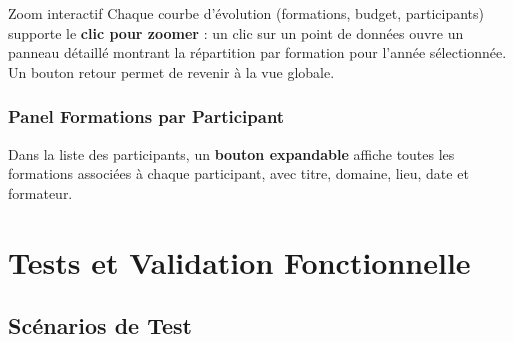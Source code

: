 \documentclass[12pt,a4paper]{report}
\begin{document}
\begin{notebox}{Zoom interactif}
Chaque courbe d'\'{e}volution (formations, budget, participants) supporte le \textbf{clic pour zoomer} : un clic sur un point de donn\'{e}es ouvre un panneau d\'{e}taill\'{e} montrant la r\'{e}partition par formation pour l'ann\'{e}e s\'{e}lectionn\'{e}e. Un bouton retour permet de revenir \`{a} la vue globale.
\end{notebox}

\subsection{Panel Formations par Participant}

Dans la liste des participants, un \textbf{bouton expandable} affiche toutes les formations associ\'{e}es \`{a} chaque participant, avec titre, domaine, lieu, date et formateur.

\clearpage
\chapter{Tests et Validation Fonctionnelle}

\section{Sc\'{e}narios de Test}
\end{document}
